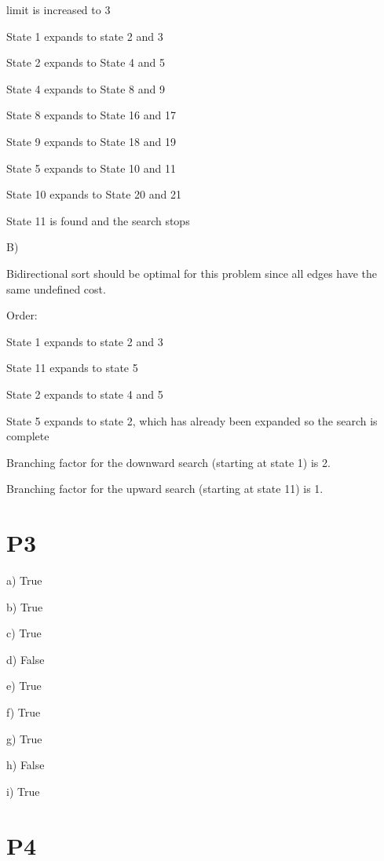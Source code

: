 \documentclass{article}
\begin{document}
limit is increased to 3

State 1 expands to state 2 and 3

State 2 expands to State 4 and 5

State 4 expands to State 8 and 9

State 8 expands to State 16 and 17

State 9 expands to State 18 and 19

State 5 expands to State 10 and 11

State 10 expands to State 20 and 21

State 11 is found and the search stops

\hspace{5mm}

B)

Bidirectional sort should be optimal for this problem since all edges have the same undefined cost.
\newline

Order:

State 1 expands to state 2 and 3

State 11 expands to state 5

State 2 expands to state 4 and 5

State 5 expands to state 2, which has already been expanded so the search is complete
\newline


Branching factor for the downward search (starting at state 1) is 2.

Branching factor for the upward search (starting at state 11) is 1.

\section*{P3}

\hspace{5mm}

a) True

b) True

c) True

d) False

e) True

f) True

g) True

h) False

i) True

\section*{P4}
\end{document}
